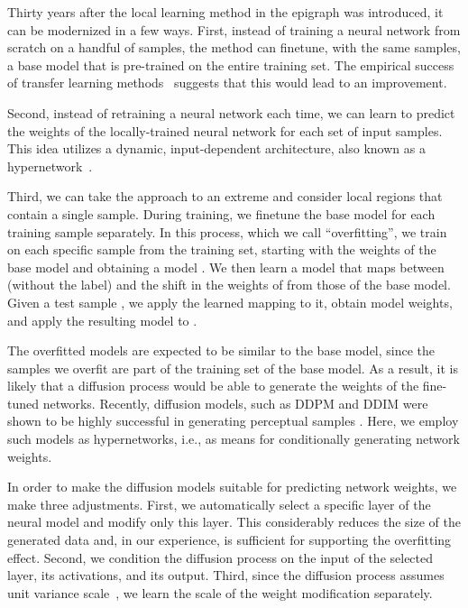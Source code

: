 \documentclass{article}
\theoremstyle{plain}
\begin{document}
Thirty years after the local learning method in the epigraph was introduced, it can be modernized in a few ways. First, instead of training a neural network from scratch on a handful of samples, the method can finetune, with the same samples, a base model that is pre-trained on the entire training set. The empirical success of transfer learning methods~\citep{finetune2} suggests that this would lead to an improvement. 

Second, instead of retraining a neural network each time, we can learn to predict the weights of the locally-trained neural network for each set of input samples. This idea utilizes a dynamic, input-dependent architecture, also known as a hypernetwork~\citep{ha2016hypernetworks}.

Third, we can take the approach to an extreme and consider local regions that contain a single sample. During training, we finetune the base model for each training sample separately. In this process, which we call ``overfitting'', we train on each specific sample  from the training set, starting with the weights of the base model and obtaining a model . We then learn a model  that maps between  (without the label) and the shift in the weights of  from those of the base model. Given a test sample , we apply the learned mapping  to it, obtain model weights, and apply the resulting model to .

The overfitted models are expected to be similar to the base model, since the samples we overfit are part of the training set of the base model. As a result, it is likely that a diffusion process would be able to generate the weights of the fine-tuned networks. Recently, diffusion models, such as DDPM \citep{ho2020denoising} and DDIM \citep{ddim} were shown to be highly successful in generating perceptual samples \citep{diffusion_beats_gan,kong2021diffwave}. Here, we employ such models as hypernetworks, i.e., as means for conditionally generating network weights. 

In order to make the diffusion models suitable for predicting network weights, we make three adjustments. First, we automatically select a specific layer of the neural model and modify only this layer. This considerably reduces the size of the generated data and, in our experience, is sufficient for supporting the overfitting effect. Second, we condition the diffusion process on the input of the selected layer, its activations, and its output. Third, since the diffusion process assumes unit variance scale~\citep{ho2020denoising}, we learn the scale of the weight modification separately.
\end{document}

